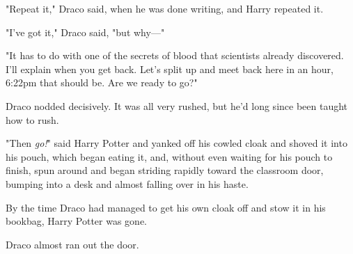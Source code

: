"Repeat it," Draco said, when he was done writing, and Harry repeated it.

"I've got it," Draco said, "but why---"

"It has to do with one of the secrets of blood that scientists already 
discovered. I'll explain when you get back. Let's split up and meet back here 
in an hour, 6:22pm that should be. Are we ready to go?"

Draco nodded decisively. It was all very rushed, but he'd long since been 
taught how to rush.

"Then \emph{go!}" said Harry Potter and yanked off his cowled cloak and shoved 
it into his pouch, which began eating it, and, without even waiting for his 
pouch to finish, spun around and began striding rapidly toward the classroom 
door, bumping into a desk and almost falling over in his haste.

By the time Draco had managed to get his own cloak off and stow it in his 
bookbag, Harry Potter was gone.

Draco almost ran out the door.
